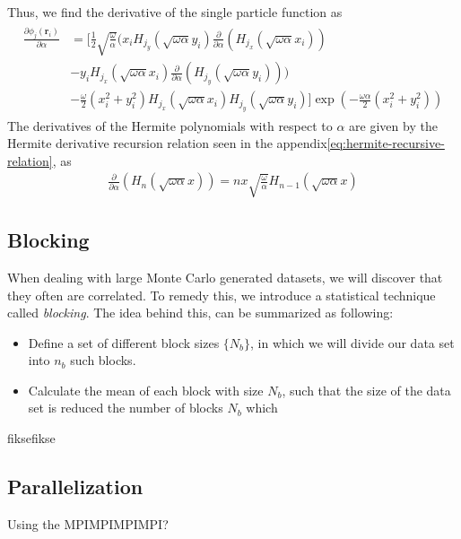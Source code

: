 \documentclass[11pt]{article}
\newcommand{\husk}[1]{\color{red} #1 \color{black}}
\begin{document}
Thus, we find the derivative of the single particle function as
\begin{align}
	\begin{split}
		\frac{\partial \phi_j(\mathbf{r}_i)}{\partial \alpha} &= \bigg[ \frac{1}{2}\sqrt{\frac{\omega}{\alpha}}\bigg( x_i H_{j_y} (\sqrt{\omega\alpha} y_i) \frac{\partial}{\partial \alpha}\left( H_{j_x} (\sqrt{\omega\alpha}x_i) \right) \\
		&- y_i H_{j_x} (\sqrt{\omega\alpha}x_i) \frac{\partial}{\partial \alpha}\left( H_{j_y} (\sqrt{\omega\alpha}y_i) \right)\bigg) \\
		&- \frac{\omega}{2}(x_i^2 + y_i^2) H_{j_x} (\sqrt{\omega\alpha}x_i) H_{j_y} (\sqrt{\omega\alpha} y_i) \bigg] \exp{\left(-\frac{\omega\alpha}{2}\left( x_i^2 + y_i^2 \right)\right)}
	\end{split}
	\label{eq:wf-sp-alpha-derivative}
\end{align}
The derivatives of the Hermite polynomials with respect to $\alpha$ are given by the Hermite derivative recursion relation seen in the appendix\eqref{eq:hermite-recursive-relation}, as
\begin{align}
	\frac{\partial}{\partial\alpha} \left(H_n(\sqrt{\omega\alpha}x)\right) = nx\sqrt{\frac{\omega}{\alpha}} H_{n-1}(\sqrt{\omega\alpha}x)
	\label{eq:hermite-alpha-derivative}
\end{align}

\subsection{Blocking}
When dealing with large Monte Carlo generated datasets, we will discover that they often are correlated. To remedy this, we introduce a statistical technique called \textit{blocking}. The idea behind this, can be summarized as following:
\begin{itemize}
	\item Define a set of different block sizes $\{N_b\}$, in which we will divide our data set into $n_b$ such blocks.
	\item Calculate the mean of each block with size $N_b$, such that the size of the data set is reduced the number of blocks $N_b$ which 
\end{itemize}
\husk{fiksefikse}


\subsection{Parallelization}
Using the MPIMPIMPIMPI?
\end{document}
